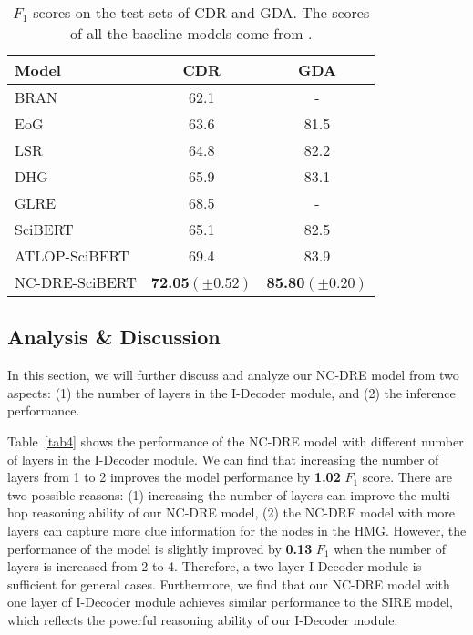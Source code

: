 \documentclass[sigconf,natbib=true]{acmart}
\begin{document}
\begin{table}[]
\centering
\begin{tabular}{p{3.7cm}cc} 
\toprule
Model               & CDR          & GDA         \\ [2pt] \toprule
BRAN \citep{c:136}                & 62.1         & -           \\
EoG \citep{c:108}                & 63.6         & 81.5        \\
LSR \citep{c:130}                & 64.8         & 82.2        \\
DHG \citep{c:138}                & 65.9         & 83.1        \\
GLRE \citep{c:131}                & 68.5         & -           \\
SciBERT \citep{c:126}        & 65.1         & 82.5        \\
ATLOP-SciBERT\citep{c:106}   & 69.4         & 83.9        \\  [2pt] \toprule
NC-DRE-SciBERT         & \textbf{72.05$(\pm0.52)$} & \textbf{85.80$(\pm0.20)$}    \\
\bottomrule
\end{tabular}
\caption{\label{tab2}$F_1$ scores on the test sets of CDR and GDA.
The scores of all the baseline models come from \cite{c:106}.
}
\end{table}

\subsection{Analysis \& Discussion}
In this section, we will further discuss and analyze our NC-DRE model from two aspects: (1) the number of layers in the I-Decoder module, and (2) the inference performance.

Table~\ref{tab4} shows the performance of the NC-DRE model with different number of layers in the I-Decoder module.
We can find that increasing the number of layers from 1 to 2 improves the model performance by \textbf{1.02} $F_1$ score.
There are two possible reasons: (1) increasing the number of layers can improve the multi-hop reasoning ability of our NC-DRE model, (2) the NC-DRE model with more layers can capture more clue information for the nodes in the HMG.
However, the performance of the model is slightly improved by \textbf{0.13} $F_1$ when the number of layers is increased from 2 to 4.
Therefore, a two-layer I-Decoder module is sufficient for general cases.
Furthermore, we find that our NC-DRE model with one layer of I-Decoder module achieves similar performance to the SIRE model, which reflects the powerful reasoning ability of our I-Decoder module.
\end{document}

